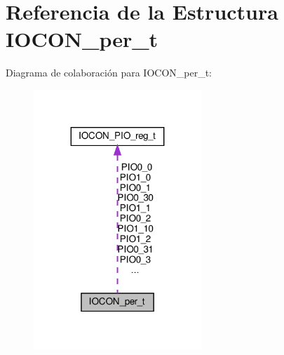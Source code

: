 \hypertarget{structIOCON__per__t}{}\section{Referencia de la Estructura I\+O\+C\+O\+N\+\_\+per\+\_\+t}
\label{structIOCON__per__t}


Diagrama de colaboración para I\+O\+C\+O\+N\+\_\+per\+\_\+t\+:\nopagebreak
\begin{figure}[H]
\begin{center}
\leavevmode
\includegraphics[width=179pt]{structIOCON__per__t__coll__graph}
\end{center}
\end{figure}
